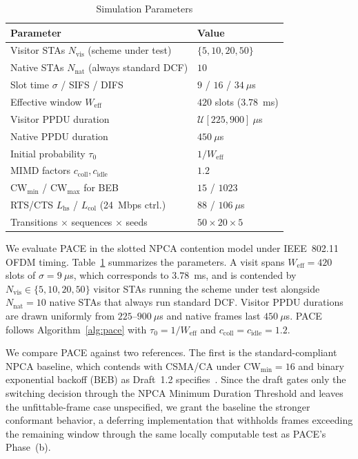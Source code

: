 \documentclass[conference]{IEEEtran}
\newcommand{\Nvis}{N_\mathrm{vis}}
\newcommand{\Nnat}{N_\mathrm{nat}}
\begin{document}
\begin{table}[t]
\centering
\caption{Simulation Parameters}
\label{tab:sim_params}
\begin{tabular}{ll}
\hline
\textbf{Parameter} & \textbf{Value} \\
\hline
Visitor STAs $\Nvis$ (scheme under test) & $\{5, 10, 20, 50\}$ \\
Native STAs $\Nnat$ (always standard DCF) & $10$ \\
Slot time $\sigma$ / SIFS / DIFS  & $9$ / $16$ / $34~\mu$s \\
Effective window $W_\mathrm{eff}$ & $420$ slots ($3.78$~ms) \\
Visitor PPDU duration            & $\mathcal{U}[225, 900]~\mu$s \\
Native PPDU duration             & $450~\mu$s \\
Initial probability $\tau_0$     & $1/W_\mathrm{eff}$ \\
MIMD factors $c_\mathrm{coll},c_\mathrm{idle}$ & $1.2$ \\
$\mathrm{CW}_{\min}$ / $\mathrm{CW}_{\max}$ for BEB & $15$ / $1023$ \\
RTS/CTS $L_\mathrm{hs}$ / $L_\mathrm{col}$ (24~Mbps ctrl.) & $88$ / $106~\mu$s \\
Transitions $\times$ sequences $\times$ seeds & $50 \times 20 \times 5$ \\
\hline
\end{tabular}
\end{table}

We evaluate PACE in the slotted NPCA contention model under IEEE~802.11 OFDM timing. Table~\ref{tab:sim_params} summarizes the parameters. A visit spans $W_\mathrm{eff}=420$ slots of $\sigma=9~\mu$s, which corresponds to $3.78$~ms, and is contended by $\Nvis\in\{5,10,20,50\}$ visitor STAs running the scheme under test alongside $\Nnat=10$ native STAs that always run standard DCF. Visitor PPDU durations are drawn uniformly from $225$--$900~\mu$s and native frames last $450~\mu$s. PACE follows Algorithm~\ref{alg:pace} with $\tau_0=1/W_\mathrm{eff}$ and $c_\mathrm{coll}=c_\mathrm{idle}=1.2$. 

We compare PACE against two references. The first is the standard-compliant NPCA baseline, which contends with CSMA/CA under $\mathrm{CW}_{\min}=16$ and binary exponential backoff (BEB) as Draft~1.2 specifies~\cite{ieee80211bn}. Since the draft gates only the switching decision through the NPCA Minimum Duration Threshold and leaves the unfittable-frame case unspecified, we grant the baseline the stronger conformant behavior, a deferring implementation that withholds frames exceeding the remaining window through the same locally computable test as PACE's Phase~(b).
\end{document}
